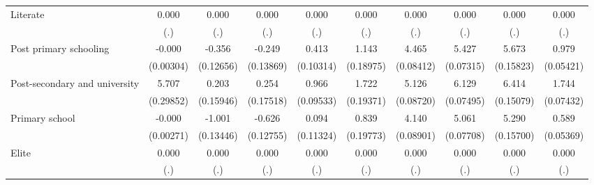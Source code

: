 {\begin{tabular}{l*{9}{c}}
Literate            &       0.000         &       0.000         &       0.000         &       0.000         &       0.000         &       0.000         &       0.000         &       0.000         &       0.000         \\
                    &         (.)         &         (.)         &         (.)         &         (.)         &         (.)         &         (.)         &         (.)         &         (.)         &         (.)         \\
Post primary schooling&      -0.000         &      -0.356\sym{**} &      -0.249         &       0.413\sym{***}&       1.143\sym{***}&       4.465\sym{***}&       5.427\sym{***}&       5.673\sym{***}&       0.979\sym{***}\\
                    &   (0.00304)         &   (0.12656)         &   (0.13869)         &   (0.10314)         &   (0.18975)         &   (0.08412)         &   (0.07315)         &   (0.15823)         &   (0.05421)         \\
Post-secondary and university&       5.707\sym{***}&       0.203         &       0.254         &       0.966\sym{***}&       1.722\sym{***}&       5.126\sym{***}&       6.129\sym{***}&       6.414\sym{***}&       1.744\sym{***}\\
                    &   (0.29852)         &   (0.15946)         &   (0.17518)         &   (0.09533)         &   (0.19371)         &   (0.08720)         &   (0.07495)         &   (0.15079)         &   (0.07432)         \\
Primary school      &      -0.000         &      -1.001\sym{***}&      -0.626\sym{***}&       0.094         &       0.839\sym{***}&       4.140\sym{***}&       5.061\sym{***}&       5.290\sym{***}&       0.589\sym{***}\\
                    &   (0.00271)         &   (0.13446)         &   (0.12755)         &   (0.11324)         &   (0.19773)         &   (0.08901)         &   (0.07708)         &   (0.15700)         &   (0.05369)         \\
Elite               &       0.000         &       0.000         &       0.000         &       0.000         &       0.000         &       0.000         &       0.000         &       0.000         &       0.000         \\
                    &         (.)         &         (.)         &         (.)         &         (.)         &         (.)         &         (.)         &         (.)         &         (.)         &         (.)         \\

\end{tabular}}
